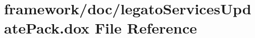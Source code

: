 \hypertarget{legato_services_update_pack_8dox}{}\section{framework/doc/legato\+Services\+Update\+Pack.dox File Reference}
\label{legato_services_update_pack_8dox}
